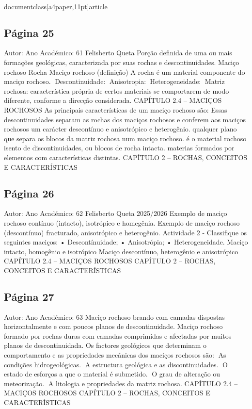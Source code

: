 \\documentclass[a4paper,11pt]{article}
\begin{document}
\subsection*{Página 25}
Autor:
Ano Académico:
61
Felisberto Queta
Porção definida de uma ou mais 
formações geológicas, caracterizada 
por suas rochas e descontinuidades.
Maciço rochoso
Rocha
Maciço rochoso (definição)
A rocha é um material
componente do maciço
rochoso.
Descontinuidade:
Anisotropia:
Heterogeneidade:
Matriz rochosa:
característica própria de certos materiais se comportarem de modo 
diferente, conforme a direcção considerada.
CAPÍTULO 2.4 – MACIÇOS ROCHOSOS 
As principais características de um
maciço rochoso são:
Essas descontinuidades separam as 
rochas dos maciços rochosos e 
conferem aos maciços rochosos um 
carácter descontínuo e anisotrópico e 
heterogênio.
qualquer plano que separa os blocos da matriz rochosa num maciço rochoso.
é o material rochoso isento de discontinuidades, ou blocos de rocha intacta.
materias formados por elementos com características distintas.
CAPÍTULO 2 – ROCHAS, CONCEITOS E CARACTERÍSTICAS



\subsection*{Página 26}
Autor:
Ano Académico:
62
Felisberto Queta
2025/2026
Exemplo de maciço rochoso contínuo (intacto), 
isotrópico e homegênia.
Exemplo de maciço rochoso (descontínuo) 
fracturado, anisotrópico e heterogênio.
Actividade 2 - Classifique 
os seguintes maciços:
•
Descontínuidade;
•
Anisotrópia;
•
Heterogeneidade.
Maciço intacto, 
homogênio e 
isotrópico
Maciço 
descontínuo, 
heterogênio e 
anisotrópico
CAPÍTULO 2.4 – MACIÇOS ROCHOSOS 
CAPÍTULO 2 – ROCHAS, CONCEITOS E CARACTERÍSTICAS



\subsection*{Página 27}
Autor:
Ano Académico:
63
Maciço rochoso brando com camadas dispostas 
horizontalmente e com poucos planos de 
descontinuidade.
Maciço rochoso formado por rochas duras com 
camadas comprimidas e afectadas por muitos 
planos de descontinuidada.
Os factores geológicos que determinam o comportamento e as propriedades mecânicas dos 
maciços rochosos são:
As condições hidrogeológicas.
A estructura geológica e as discontinuidades.
O estado de esforços a que o material é submetido.
O grau de alteração ou meteorização.
A litologia e propriedades da matriz rochosa.
CAPÍTULO 2.4 – MACIÇOS ROCHOSOS 
CAPÍTULO 2 – ROCHAS, CONCEITOS E CARACTERÍSTICAS
\end{document}
